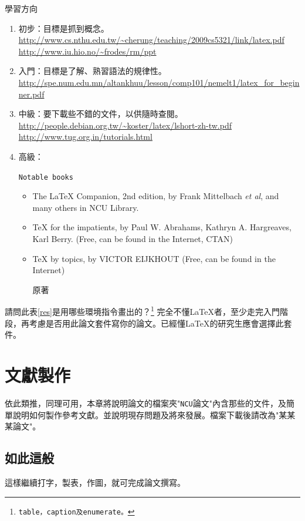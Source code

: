 \begin{table}[hbt!]
\caption{學習方向}
\begin{enumerate}
\item{\color{blue} 初步：目標是抓到概念。}\\
\url{http://www.cs.nthu.edu.tw/~cherung/teaching/2009cs5321/link/latex.pdf}\\
\url{http://www.iu.hio.no/~frodes/rm/ppt}
\item{\color{cyan} 入門：目標是了解、熟習語法的規律性。\\ 
\url{http://spe.num.edu.mn/altankhuu/lesson/comp101/nemelt1/latex_for_beginner.pdf}}
\item{\color{yellow}
中級：要下載些不錯的文件，以供隨時查閱。}\\ 
\url{http://people.debian.org.tw/~koster/latex/lshort-zh-tw.pdf}\\
\url{http://www.tug.org.in/tutorials.html}
\item
高級：{\tt Notable books 
\begin{itemize}
\item The \LaTeX{ }Companion, 2nd edition, by  Frank Mittelbach {\it et al}, and many others in NCU Library.
\item TeX for the impatients, by Paul W. Abrahams, Kathryn A. Hargreaves, Karl Berry. (Free, can be found in the Internet, CTAN)
\item TeX by topics, by VICTOR EIJKHOUT (Free, can be found in the Internet)
\item [原著] \cite{knu84,lam94}
\end{itemize}}
\end{enumerate}
\label{res}
\end{table}%
請問此表\ref{res}是用哪些環境指令畫出的？\footnote{\tt table，caption及enumerate。}
完全不懂\LaTeX{}者，至少走完入門階段，再考慮是否用此論文套件寫你的論文。已經懂\LaTeX{}的研究生應會選擇此套件。



\chapter{文獻製作}
依此類推，同理可用，本章將說明論文的檔案夾"{\tt NCU}論文"內含那些的文件，及簡單說明如何製作參考文獻。並說明現存問題及將來發展。檔案下載後請改為"某某某論文"。
\section{如此這般}
這樣繼續打字，製表，作圖，就可完成論文撰寫。
